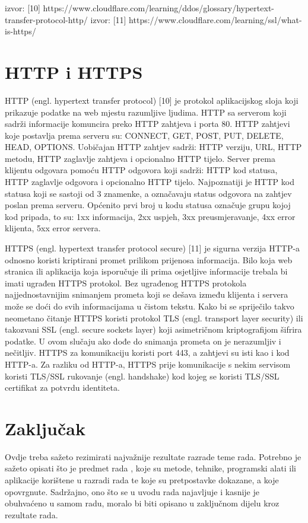 \documentclass[]{foi}
\begin{document}
\cite{cloudflare-http}
izvor: [10] https://www.cloudflare.com/learning/ddos/glossary/hypertext-transfer-protocol-http/
\cite{cloudflare-https}
izvor: [11] https://www.cloudflare.com/learning/ssl/what-is-https/

\chapter{HTTP i HTTPS}

HTTP (engl. hypertext transfer protocol) [10] je protokol aplikacijskog sloja koji prikazuje podatke na web mjestu razumljive ljudima.
HTTP sa serverom koji sadrži informacije komuncira preko HTTP zahtjeva i porta 80.
HTTP zahtjevi koje postavlja prema serveru su: CONNECT, GET, POST, PUT, DELETE, HEAD, OPTIONS.
Uobičajan HTTP zahtjev sadrži: HTTP verziju, URL, HTTP metodu, HTTP zaglavlje zahtjeva i opcionalno HTTP tijelo.
Server prema klijentu odgovara pomoću HTTP odgovora koji sadrži: HTTP kod statusa, HTTP zaglavlje odgovora i opcionalno HTTP tijelo.
Najpoznatiji je HTTP kod statusa koji se sastoji od 3 znamenke, a označavaju status odgovora na zahtjev poslan prema serveru.
Općenito prvi broj u kodu statusa označuje grupu kojoj kod pripada, to su: 1xx informacija, 2xx uspjeh, 3xx preusmjeravanje, 4xx error klijenta, 5xx error servera.

HTTPS (engl. hypertext transfer protocol secure) [11] je sigurna verzija HTTP-a odnosno koristi kriptirani promet prilikom prijenosa informacija.
Bilo koja web stranica ili aplikacija koja isporučuje ili prima osjetljive informacije trebala bi imati ugrađen HTTPS protokol.
Bez ugrađenog HTTPS protokola najjednostavnijim snimanjem prometa koji se dešava između klijenta i servera može se doći do svih informacijama u čistom tekstu.
Kako bi se spriječilo takvo neometano čitanje HTTPS koristi protokol TLS (engl. transport layer security) ili takozvani SSL (engl. secure sockets layer) koji asimetričnom kriptografijom šifrira podatke.
U ovom slučaju ako dođe do snimanja prometa on je nerazumljiv i nečitljiv.
HTTPS za komunikaciju koristi port 443, a zahtjevi su isti kao i kod HTTP-a.
Za razliku od HTTP-a, HTTPS prije komunikacije s nekim servisom koristi TLS/SSL rukovanje (engl. handshake) kod kojeg se koristi TLS/SSL certifikat za potvrdu identiteta.

\chapter{Zaključak}

Ovdje treba sažeto rezimirati najvažnije rezultate razrade teme rada. Potrebno je sažeto opisati što je predmet rada \cite{copeland2020ArtificialIntelligence}, koje su metode, tehnike, programski alati ili aplikacije korištene u razradi rada te koje su pretpostavke dokazane, a koje opovrgnute. Sadržajno, ono što se u uvodu rada najavljuje i kasnije je obuhvaćeno u samom radu, moralo bi biti opisano u zaključnom dijelu kroz rezultate rada.
\end{document}
